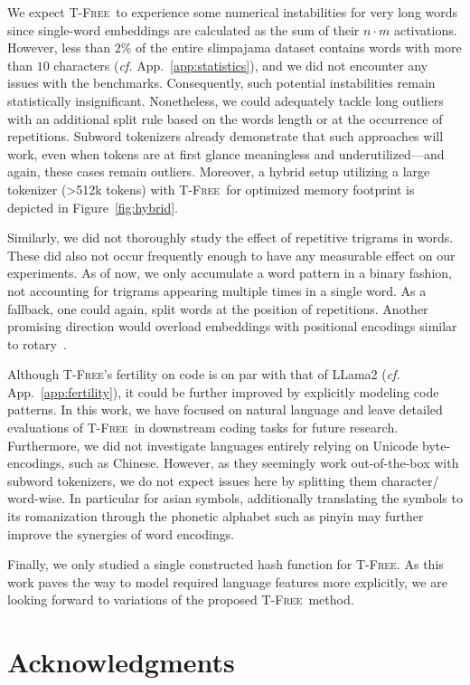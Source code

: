 \documentclass[11pt]{article}
\newcommand{\method}{\textsc{T-Free}}
\begin{document}
We expect \method\ to experience some numerical instabilities for very long words since single-word embeddings are calculated as the sum of their $n \cdot m$ activations. However, less than $2\%$ of the entire slimpajama dataset contains words with more than $10$ characters (\emph{cf.} App.~\ref{app:statistics}), and we did not encounter any issues with the benchmarks. Consequently, such potential instabilities remain statistically insignificant.
Nonetheless, we could adequately tackle long outliers with an additional split rule based on the words length or at the occurrence of repetitions. Subword tokenizers already demonstrate that such approaches will work, even when tokens are at first glance meaningless and underutilized---and again, these cases remain outliers. Moreover, a hybrid setup utilizing a large tokenizer (>512k tokens) with \method~for optimized memory footprint is depicted in Figure~\ref{fig:hybrid}.

Similarly, we did not thoroughly study the effect of repetitive trigrams in words. These did also not occur frequently enough to have any measurable effect on our experiments. As of now, we only accumulate a word pattern in a binary fashion, not accounting for trigrams appearing multiple times in a single word.
As a fallback, one could again, split words at the position of repetitions. Another promising direction would overload embeddings with positional encodings similar to rotary~\cite{rotary}. 

Although \method's fertility on code is on par with that of LLama2 (\emph{cf.} App.~\ref{app:fertility}), it could be further improved by explicitly modeling code patterns. In this work, we have focused on natural language and leave detailed evaluations of \method\ in downstream coding tasks for future research.
Furthermore, we did not investigate languages entirely relying on Unicode byte-encodings, such as Chinese. However, as they seemingly work out-of-the-box with subword tokenizers, we do not expect issues here by splitting them character/ word-wise. In particular for asian symbols, additionally translating the symbols to its romanization through the phonetic alphabet such as pinyin may further improve the synergies of word encodings. 

Finally, we only studied a single constructed hash function for \method. As this work paves the way to model required language features more explicitly, we are looking forward to variations of the proposed \method~method.

\section*{Acknowledgments}
\end{document}
